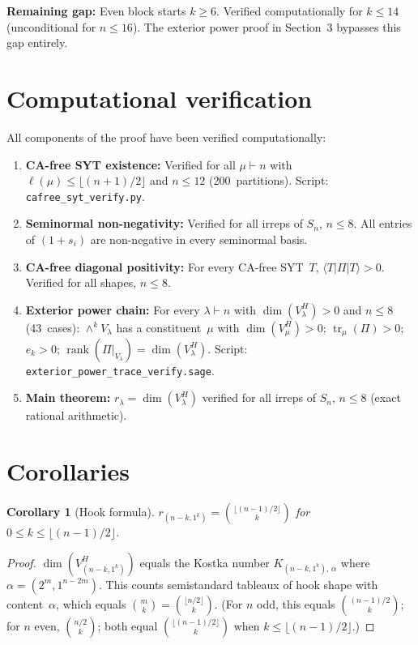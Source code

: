 \documentclass[11pt]{article}
\newtheorem{corollary}[theorem]{Corollary}
\theoremstyle{definition}
\theoremstyle{remark}
\DeclareMathOperator{\rank}{rank}
\DeclareMathOperator{\tr}{tr}
\begin{document}
\textbf{Remaining gap:} Even block starts $k \ge 6$. Verified
computationally for $k \le 14$ (unconditional for $n \le 16$).
The exterior power proof in Section~3 bypasses this gap entirely.

\section{Computational verification}

All components of the proof have been verified computationally:

\begin{enumerate}
\item \textbf{CA-free SYT existence:} Verified for all $\mu \vdash n$
  with $\ell(\mu) \le \lfloor(n+1)/2\rfloor$ and $n \le 12$
  (200~partitions). Script: \texttt{cafree\_syt\_verify.py}.

\item \textbf{Seminormal non-negativity:} Verified for all irreps of
  $S_n$, $n \le 8$. All entries of $(1+s_i)$ are non-negative in
  every seminormal basis.

\item \textbf{CA-free diagonal positivity:} For every CA-free SYT~$T$,
  $\langle T|\Pi|T\rangle > 0$. Verified for all shapes,
  $n \le 8$.

\item \textbf{Exterior power chain:} For every $\lambda \vdash n$
  with $\dim(V_\lambda^H) > 0$ and $n \le 8$ (43~cases):
  $\wedge^k V_\lambda$ has a constituent~$\mu$ with
  $\dim(V_\mu^H) > 0$; $\tr_\mu(\Pi) > 0$; $e_k > 0$;
  $\rank(\Pi|_{V_\lambda}) = \dim(V_\lambda^H)$.
  Script: \texttt{exterior\_power\_trace\_verify.sage}.

\item \textbf{Main theorem:} $r_\lambda = \dim(V_\lambda^H)$ verified
  for all irreps of $S_n$, $n \le 8$ (exact rational arithmetic).
\end{enumerate}

\section{Corollaries}

\begin{corollary}[Hook formula]
$r_{(n-k,1^k)} = \binom{\lfloor(n-1)/2\rfloor}{k}$ for
$0 \le k \le \lfloor(n-1)/2\rfloor$.
\end{corollary}
\begin{proof}
$\dim(V_{(n-k,1^k)}^H)$ equals the Kostka number
$K_{(n-k,1^k),\,\alpha}$ where $\alpha = (2^m, 1^{n-2m})$.
This counts semistandard tableaux of hook shape with content~$\alpha$,
which equals $\binom{m}{k} = \binom{\lfloor n/2\rfloor}{k}$.
(For $n$ odd, this equals $\binom{(n-1)/2}{k}$; for $n$ even,
$\binom{n/2}{k}$; both equal
$\binom{\lfloor(n-1)/2\rfloor}{k}$ when $k \le \lfloor(n-1)/2\rfloor$.)
\end{proof}
\end{document}
